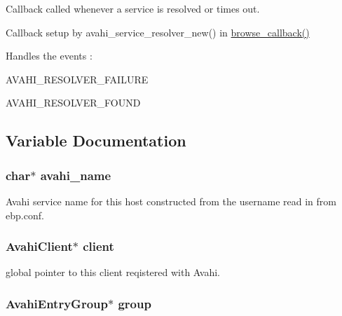\-Callback called whenever a service is resolved or times out. 

\-Callback setup by avahi\-\_\-service\-\_\-resolver\-\_\-new() in \hyperlink{avahi-discovery_8c_a2b331683eee5e4914140744a173bc068}{browse\-\_\-callback()}

\-Handles the events \-:
\begin{DoxyItemize}
\item \-A\-V\-A\-H\-I\-\_\-\-R\-E\-S\-O\-L\-V\-E\-R\-\_\-\-F\-A\-I\-L\-U\-R\-E
\item \-A\-V\-A\-H\-I\-\_\-\-R\-E\-S\-O\-L\-V\-E\-R\-\_\-\-F\-O\-U\-N\-D 
\end{DoxyItemize}

\subsection{\-Variable \-Documentation}
\hypertarget{avahi-discovery_8h_a00d2e23f410688d2be9cdc94dab23f3e}{
\subsubsection[{avahi\-\_\-name}]{\setlength{\rightskip}{0pt plus 5cm}char$\ast$ {\bf avahi\-\_\-name}}}\label{avahi-discovery_8h_a00d2e23f410688d2be9cdc94dab23f3e}


\-Avahi service name for this host constructed from the username read in from ebp.\-conf. 

\hypertarget{avahi-discovery_8h_aa13ccffa23fd1cfe24c33471fbc1f57f}{
\subsubsection[{client}]{\setlength{\rightskip}{0pt plus 5cm}\-Avahi\-Client$\ast$ {\bf client}}}\label{avahi-discovery_8h_aa13ccffa23fd1cfe24c33471fbc1f57f}


global pointer to this client reqistered with \-Avahi. 

\hypertarget{avahi-discovery_8h_a119e28fc15e5a79e06fcb294b9424e53}{
\subsubsection[{group}]{\setlength{\rightskip}{0pt plus 5cm}\-Avahi\-Entry\-Group$\ast$ {\bf group}}}\label{avahi-discovery_8h_a119e28fc15e5a79e06fcb294b9424e53}


